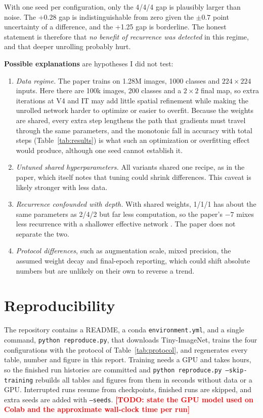 \documentclass[conference]{IEEEtran}
\newcommand{\todo}[1]{\textcolor{red}{\textbf{[TODO: #1]}}}
\begin{document}
With one seed per configuration, only the 4/4/4 gap is plausibly larger than noise. The +0.28 gap is indistinguishable from zero given the $\pm0.7$ point uncertainty of a difference, and the +1.25 gap is borderline. The honest statement is therefore that \emph{no benefit of recurrence was detected} in this regime, and that deeper unrolling probably hurt.

\textbf{Possible explanations} are hypotheses I did not test:
\begin{enumerate}
\item \emph{Data regime.} The paper trains on 1.28M images, 1000 classes and $224\times224$ inputs. Here there are 100k images, 200 classes and a $2\times2$ final map, so extra iterations at V4 and IT may add little spatial refinement while making the unrolled network harder to optimize or easier to overfit. Because the weights are shared, every extra step lengthens the path that gradients must travel through the same parameters, and the monotonic fall in accuracy with total steps (Table~\ref{tab:results}) is what such an optimization or overfitting effect would produce, although one seed cannot establish it.
\item \emph{Untuned shared hyperparameters.} All variants shared one recipe, as in the paper, which itself notes that tuning could shrink differences. This caveat is likely stronger with less data.
\item \emph{Recurrence confounded with depth.} With shared weights, 1/1/1 has about the same parameters as 2/4/2 but far less computation, so the paper's $-7$ mixes less recurrence with a shallower effective network \cite{liao2016}. The paper does not separate the two.
\item \emph{Protocol differences}, such as augmentation scale, mixed precision, the assumed weight decay and final-epoch reporting, which could shift absolute numbers but are unlikely on their own to reverse a trend.
\end{enumerate}


\section{Reproducibility}
The repository contains a README, a conda \texttt{environment.yml}, and a single command, \texttt{python reproduce.py}, that downloads Tiny-ImageNet, trains the four configurations with the protocol of Table~\ref{tab:protocol}, and regenerates every table, number and figure in this report. Training needs a GPU and takes hours, so the finished run histories are committed and \texttt{python reproduce.py --skip-training} rebuilds all tables and figures from them in seconds without data or a GPU. Interrupted runs resume from checkpoints, finished runs are skipped, and extra seeds are added with \texttt{--seeds}. \todo{state the GPU model used on Colab and the approximate wall-clock time per run}
\end{document}
